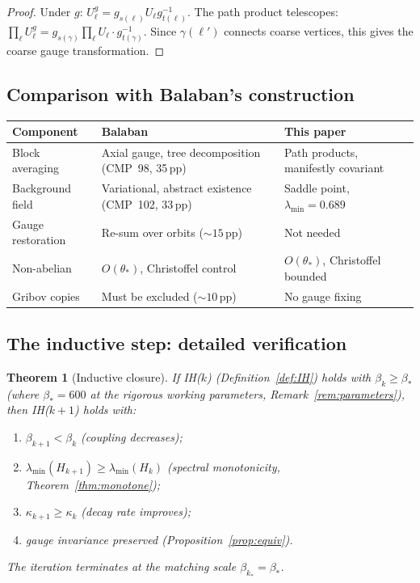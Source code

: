 \documentclass[11pt]{article}
\newtheorem{theorem}{Theorem}[section]
\theoremstyle{definition}
\begin{document}
\begin{proof}
Under $g$: $U_\ell^g=g_{s(\ell)}U_\ell g_{t(\ell)}^{-1}$.  The
path product telescopes:
$\prod_\ell U_\ell^g=g_{s(\gamma)}\prod_\ell U_\ell\cdot g_{t(\gamma)}^{-1}$.
Since $\gamma(\ell')$ connects coarse vertices, this gives the
coarse gauge transformation.
\end{proof}

\subsection{Comparison with Balaban's construction}

\begin{center}
\begin{tabular}{p{3cm}p{5cm}p{5cm}}
\toprule
\textbf{Component} & \textbf{Balaban} & \textbf{This paper}\\
\midrule
Block averaging & Axial gauge, tree
decomposition~\cite{BalabanAvg,BalabanVar} (CMP~98, 35\,pp) &
Path products, manifestly covariant\\
Background field & Variational, abstract existence (CMP~102, 33\,pp) &
Saddle point, $\lambda_{\min}=0.689$\\
Gauge restoration & Re-sum over orbits (${\sim}15$\,pp) &
Not needed\\
Non-abelian & $O(\theta_*)$, Christoffel control &
$O(\theta_*)$, Christoffel bounded\\
Gribov copies & Must be excluded (${\sim}10$\,pp) & No gauge fixing\\
\bottomrule
\end{tabular}
\end{center}

\subsection{The inductive step: detailed verification}

\begin{theorem}[Inductive closure]\label{thm:inductive}
If IH($k$) (Definition~\ref{def:IH}) holds with $\beta_k\ge\beta_*$
(where $\beta_*=600$ at the rigorous working parameters,
Remark~\ref{rem:parameters}),
then IH($k+1$) holds with:
\begin{enumerate}[nosep,label=(\roman*)]
\item $\beta_{k+1}<\beta_k$ (coupling decreases);
\item $\lambda_{\min}(H_{k+1})\ge\lambda_{\min}(H_k)$ (spectral
monotonicity, Theorem~\ref{thm:monotone});
\item $\kappa_{k+1}\ge\kappa_k$ (decay rate improves);
\item gauge invariance preserved (Proposition~\ref{prop:equiv}).
\end{enumerate}
The iteration terminates at the matching scale
$\beta_{k_*}=\beta_*$.
\end{theorem}
\end{document}
